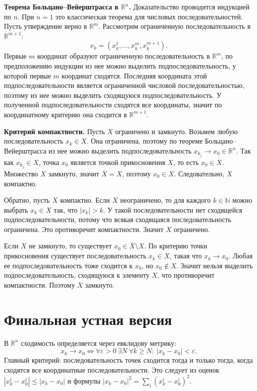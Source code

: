\documentclass[12pt,a4paper]{article}
\newcommand{\R}{\mathbb{R}}
\newcommand{\eps}{\varepsilon}
\begin{document}
\textbf{Теорема Больцано--Вейерштрасса в \(\R^n\).}
Доказательство проводится индукцией по \(n\). При \(n=1\) это классическая
теорема для числовых последовательностей. Пусть утверждение верно в
\(\R^m\). Рассмотрим ограниченную последовательность в \(\R^{m+1}\):
\[
  x_k=(x_k^1,\dots,x_k^m,x_k^{m+1}).
\]
Первые \(m\) координат образуют ограниченную последовательность в \(\R^m\),
по предположению индукции из нее можно выделить подпоследовательность, у
которой первые \(m\) координат сходятся. Последняя координата этой
подпоследовательности является ограниченной числовой последовательностью,
поэтому из нее можно выделить сходящуюся подпоследовательность. У полученной
подпоследовательности сходятся все координаты, значит по координатному
критерию она сходится в \(\R^{m+1}\).

\textbf{Критерий компактности.}
Пусть \(X\) ограничено и замкнуто. Возьмем любую последовательность
\(x_k\in X\). Она ограничена, поэтому по теореме Больцано--Вейерштрасса из
нее можно выделить подпоследовательность \(x_{k_j}\to x_0\in\R^n\). Так как
\(x_{k_j}\in X\), точка \(x_0\) является точкой прикосновения \(X\), то есть
\(x_0\in\overline X\). Множество \(X\) замкнуто, значит
\(\overline X=X\), поэтому \(x_0\in X\). Следовательно, \(X\) компактно.

Обратно, пусть \(X\) компактно. Если \(X\) неограничено, то для каждого
\(k\in\mathbb N\) можно выбрать \(x_k\in X\) так, что \(|x_k|>k\). У такой
последовательности нет сходящейся подпоследовательности, потому что всякая
сходящаяся последовательность ограничена. Это противоречит компактности.
Значит \(X\) ограничено.

Если \(X\) не замкнуто, то существует \(x_0\in\overline X\setminus X\). По
критерию точки прикосновения существует последовательность \(x_k\in X\),
такая что \(x_k\to x_0\). Любая ее подпоследовательность тоже сходится к
\(x_0\), но \(x_0\notin X\). Значит нельзя выделить подпоследовательность,
сходящуюся к элементу \(X\), что противоречит компактности. Поэтому \(X\)
замкнуто.

\section*{Финальная устная версия}

В \(\R^n\) сходимость определяется через евклидову метрику:
\[
  x_k\to x_0 \Longleftrightarrow
  \forall\eps>0\ \exists N\ \forall k\ge N:\ |x_k-x_0|<\eps.
\]
Главный критерий: последовательность точек сходится тогда и только тогда,
когда сходятся все координатные последовательности. Это следует из оценок
\(|x_k^i-x_0^i|\le |x_k-x_0|\) и формулы
\(|x_k-x_0|^2=\sum_i(x_k^i-x_0^i)^2\).
\end{document}
